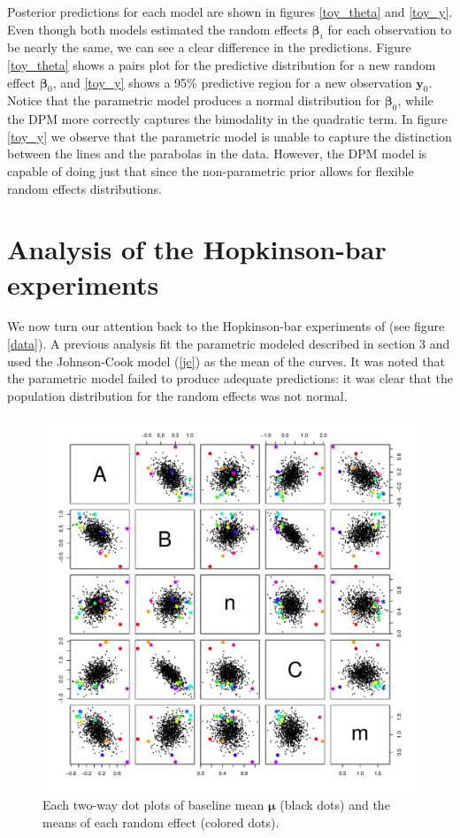 \documentclass[12pt]{article}
\newcommand{\m}[1]{\mathbf{\bm{#1}}}
\begin{document}
Posterior predictions for each model are shown in figures \ref{toy_theta} and \ref{toy_y}. Even though both models estimated the random effects $\m{\beta}_i$ for each observation to be nearly the same, we can see a clear difference in the predictions. Figure \ref{toy_theta} shows a pairs plot for the predictive distribution for a new random effect $\m{\beta}_0$, and \ref{toy_y} shows a 95\% predictive region for a new observation $\m{y}_0$. Notice that the parametric model produces a normal distribution for $\m{\beta}_0$, while the DPM more correctly captures the bimodality in the quadratic term. In figure \ref{toy_y} we observe that the parametric model is unable to capture the distinction between the lines and the parabolas in the data. However, the DPM model is capable of doing just that since the non-parametric prior allows for flexible random effects distributions.

\section{Analysis of the Hopkinson-bar experiments}

We now turn our attention back to the Hopkinson-bar experiments of \cite{chen1996constitutive} (see figure \ref{data}). A previous analysis fit the parametric modeled described in section 3 and used the Johnson-Cook model (\ref{jc}) as the mean of the curves. It was noted that the parametric model failed to produce adequate predictions: it was clear that the population distribution for the random effects was not normal.

\begin{figure}
\begin{center}
\includegraphics[scale=0.43]{../figs/ms_clusters.pdf}
\caption{Each two-way dot plots of baseline mean $\m{\mu}$ (black dots) and the means of each random effect (colored dots).}
\label{ms_clusters}
\end{center}
\end{figure}
\end{document}
